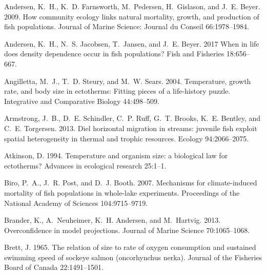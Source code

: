 \documentclass[11pt]{article}\usepackage[]{graphicx}\usepackage[]{color,soul}
\begin{document}

\begin{thebibliography}{55}
\linespread{1.5}
\providecommand{\natexlab}[1]{#1}

Andersen, K.~H., K.~D. Farnsworth, M.~Pedersen, H.~Gislason, and J.~E. Beyer.
  2009.
\newblock How community ecology links natural mortality, growth, and production
  of fish populations.
 Journal of Marine Science: Journal du Conseil 66:1978--1984.

Andersen, K.~H., N.~S. Jacobsen, T.~Jansen, and J.~E. Beyer. 2017
\newblock When in life does density dependence occur in fish populations?
\newblock Fish and Fisheries 18:656--667.

Angilletta, M.~J., T.~D. Steury, and M.~W. Sears. 2004.
\newblock Temperature, growth rate, and body size in ectotherms: Fitting pieces
  of a life-history puzzle.
\newblock Integrative and Comparative Biology 44:498--509.

Armstrong, J.~B., D.~E. Schindler, C.~P. Ruff, G.~T. Brooks, K.~E. Bentley, and
  C.~E. Torgersen. 2013.
\newblock Diel horizontal migration in streams: juvenile fish exploit spatial
  heterogeneity in thermal and trophic resources.
\newblock Ecology 94:2066--2075.

Atkinson, D. 1994.
\newblock Temperature and organism size: a biological law for ectotherms?
\newblock Advances in ecological research 25:1--1.

Biro, P.~A., J.~R. Post, and D.~J. Booth. 2007.
\newblock Mechanisms for climate-induced mortality of fish populations in
  whole-lake experiments.
\newblock Proceedings of the National Academy of Sciences 104:9715--9719.

Brander, K., A.~Neuheimer, K.~H. Andersen, and M.~Hartvig. 2013.
\newblock Overconfidence in model projections.
 Journal of Marine Science 70:1065--1068.

Brett, J. 1965.
\newblock The relation of size to rate of oxygen consumption and sustained
  swimming speed of sockeye salmon (oncorhynchus nerka).
\newblock Journal of the Fisheries Board of Canada 22:1491--1501.


\end{thebibliography}
\end{document}
